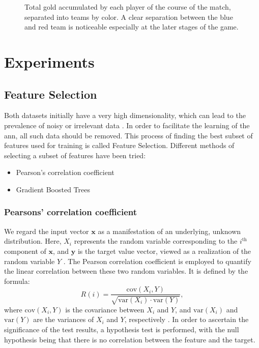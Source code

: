 \documentclass[12pt, a4paper, headinclude, twoside, plainheadsepline, open=right, numbers=noenddot, hidelinks, toc=listof, toc=bibliography]{scrreprt}
\begin{document}
\begin{figure}

\caption{Total gold accumulated by each player of the course of the match, separated into teams by color. 
A clear separation between the blue and red team is noticeable especially at the later stages of the game.}
\label{fig:totalGold}
\end{figure}



\chapter{Experiments}
\label{chap:experiments}

\section{Feature Selection}
\label{sec:feature_selection}

Both datasets initially have a very high dimensionality, which can lead to the prevalence of noisy or irrelevant data \cite{venkateshReviewFeatureSelection2019}.
In order to facilitate the learning of the \ac{ann}, all such data should be removed.
This process of finding the best subset of features used for training is called Feature Selection.
Different methods of selecting a subset of features have been tried:
\begin{itemize}
\item Pearson's correlation coefficient
\item Gradient Boosted Trees
\end{itemize}

\subsection{Pearsons' correlation coefficient}
\label{ssec:pearsons}

We regard the input vector $\mathbf{x}$ as a manifestation of an underlying, unknown distribution. 
Here, $X_i$ represents the random variable corresponding to the $i^{\text{th}}$ component of $\mathbf{x}$, and $\mathbf{y}$ is the target value vector, viewed as a realization of the random variable $Y$ \cite{guyonIntroductionVariableFeature}. 
The Pearson correlation coefficient is employed to quantify the linear correlation between these two random variables. It is defined by the formula:
\begin{equation}
R(i) = \frac{\text{cov}(X_i, Y)}{\sqrt{\text{var}(X_i) \cdot \text{var}(Y)}},
\end{equation}
where $\text{cov}(X_i, Y)$ is the covariance between $X_i$ and $Y$, and $\text{var}(X_i)$ and $\text{var}(Y)$ are the variances of $X_i$ and $Y$, respectively \cite{chandrashekarSurveyFeatureSelection2014a}.
In order to ascertain the significance of the test results, a hypothesis test is performed, with the null hypothesis being that there is no correlation between the feature and the target.
\end{document}
